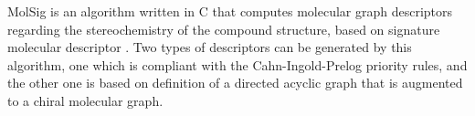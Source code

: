 MolSig is an algorithm written in C that computes molecular graph descriptors regarding the stereochemistry of the compound structure, based on signature molecular descriptor \cite{Carbonell_2013}. Two types of descriptors can be generated by this algorithm, one which is compliant with the Cahn-Ingold-Prelog priority rules, and the other one is based on definition of a directed acyclic graph that is augmented to a chiral molecular graph.